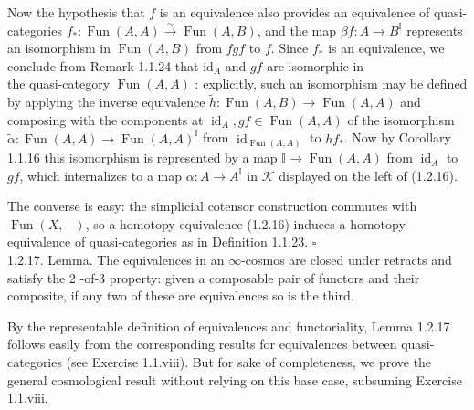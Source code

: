 \documentclass[10pt]{article}
\begin{document}
Now the hypothesis that $f$ is an equivalence also provides an equivalence of quasi-categories $f_{*}: \operatorname{Fun}(A, A) \xrightarrow{\sim} \operatorname{Fun}(A, B)$, and the map $\beta f: A \rightarrow B^{\mathbb{I}}$ represents an isomorphism in $\operatorname{Fun}(A, B)$ from $f g f$ to $f$. Since $f_{*}$ is an equivalence, we conclude from Remark 1.1.24 that $\mathrm{id}_{A}$ and $g f$ are isomorphic in\\
the quasi-category $\operatorname{Fun}(A, A)$ : explicitly, such an isomorphism may be defined by applying the inverse equivalence $\tilde{h}: \operatorname{Fun}(A, B) \rightarrow \operatorname{Fun}(A, A)$ and composing with the components at $\operatorname{id}_{A}, g f \in \operatorname{Fun}(A, A)$ of the isomorphism $\widetilde{\alpha}: \operatorname{Fun}(A, A) \rightarrow \operatorname{Fun}(A, A)^{\mathbb{I}}$ from $\operatorname{id}_{\operatorname{Fun}(A, A)}$ to $\widetilde{h} f_{*}$. Now by Corollary 1.1.16 this isomorphism is represented by a map $\mathbb{I} \rightarrow \operatorname{Fun}(A, A)$ from $\operatorname{id}_{A}$ to $g f$, which internalizes to a map $\alpha: A \rightarrow A^{\mathbb{I}}$ in $\mathcal{K}$ displayed on the left of (1.2.16).

The converse is easy: the simplicial cotensor construction commutes with $\operatorname{Fun}(X,-)$, so a homotopy equivalence (1.2.16) induces a homotopy equivalence of quasi-categories as in Definition 1.1.23. \(\square\)\\
1.2.17. Lemma. The equivalences in an $\infty$-cosmos are closed under retracts and satisfy the 2 -of-3 property: given a composable pair of functors and their composite, if any two of these are equivalences so is the third.

By the representable definition of equivalences and functoriality, Lemma 1.2.17 follows easily from the corresponding results for equivalences between quasi-categories (see Exercise 1.1.viii). But for sake of completeness, we prove the general cosmological result without relying on this base case, subsuming Exercise 1.1.viii.
\end{document}
